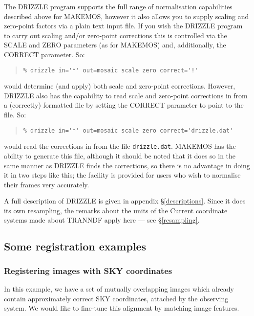 \documentclass[twoside,11pt]{article}
\newcommand{\hyperref}[4]{#2\ref{#4}#3}
\newcommand{\htmlref}[2]{#1}
\newcommand{\latexhtml}[2]{#1}
\newcommand{\xlabel}[1]{}
\renewcommand{\_}{\texttt{\symbol{95}}}
\newcommand{\ttsize}{\latexhtml{\small}{}}
\newenvironment{myquote}{\begin{quote}\ttsize}{\end{quote}}
\newcommand{\routine}[1]{{\sc #1}}
\newcommand{\xroutine}[1]{\htmlref{{\sc #1}}{#1}}
\begin{document}
The \routine{DRIZZLE} program supports the full range of normalisation
capabilities described above for \routine{MAKEMOS}, however
it also allows you to supply scaling and zero-point factors via a
plain text input file.
If you wish the \routine{DRIZZLE} program to carry out scaling and/or
zero-point corrections this is controlled via the SCALE and
ZERO parameters (as for \routine{MAKEMOS}) and, additionally,
the CORRECT parameter. So:
\begin{myquote}
\begin{verbatim}
% drizzle in='*' out=mosaic scale zero correct='!'
\end{verbatim}
\end{myquote}
would determine (and apply) both scale and zero-point corrections. However,
\routine{DRIZZLE} also has the capability to read scale and zero-point
corrections in from a (correctly) formatted file by setting the
CORRECT parameter to point to the file. So:
\begin{myquote}
\begin{verbatim}
% drizzle in='*' out=mosaic scale zero correct='drizzle.dat'
\end{verbatim}
\end{myquote}
would read the corrections in from the file {\tt drizzle.dat}. 
\routine{MAKEMOS} has the ability to generate this file,
although it should be noted that it does so in the same manner as
\routine{DRIZZLE} finds the corrections, so there is no advantage in
doing it in two steps like this; the facility is provided 
for users who wish to normalise their frames very accurately. 

A full description of \xroutine{DRIZZLE} is
given in appendix \S\ref{descriptions}.
Since it does its own resampling, the remarks 
about the units of the Current coordinate systems made about
\routine{TRANNDF} apply here --- 
see \hyperref{the section on resampling}{\S }{}{resampling}.



\subsection{\xlabel{regexamples}\label{regexamples}Some registration examples}

\subsubsection{Registering images with SKY coordinates}

In this example, we have a set of mutually overlapping 
images which already contain approximately correct 
SKY coordinates, attached by the observing system.
We would like to fine-tune this alignment by matching image features.
\end{document}
